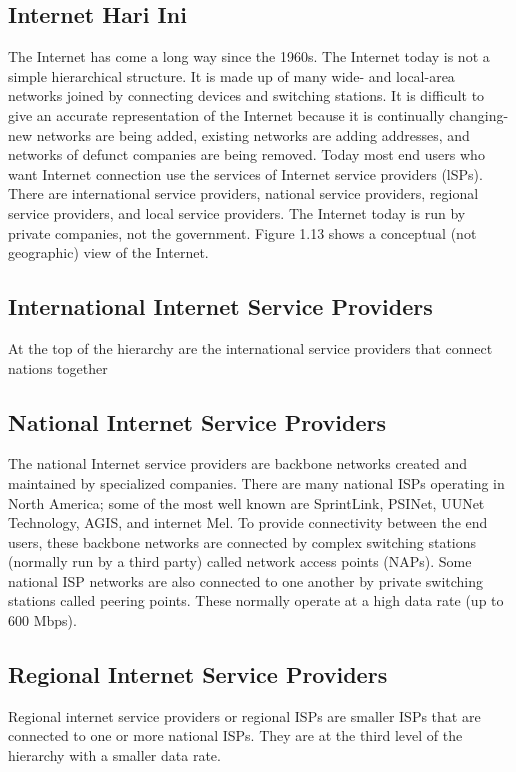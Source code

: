 \subsection{Internet Hari Ini}
The Internet has come a long way since the 1960s. The Internet today is not a simple hierarchical structure. It is made up of many wide- and local-area networks joined by connecting devices and switching stations. It is difficult to give an accurate representation of the Internet because it is continually changing-new networks are being added, existing networks are adding addresses, and networks of defunct companies are being removed. Today most end users who want Internet connection use the services of Internet service providers (lSPs). There are international service providers, national service providers, regional service providers, and local service providers. The Internet today is run by private companies, not the government. Figure 1.13 shows a conceptual (not geographic) view of the Internet.

\subsection*{International Internet Service Providers}
At the top of the hierarchy are the international service providers that connect nations together

\subsection*{National Internet Service Providers}
The national Internet service providers are backbone networks created and maintained by specialized companies. There are many national ISPs operating in North America; some of the most well known are SprintLink, PSINet, UUNet Technology, AGIS, and internet Mel. To provide connectivity between the end users, these backbone networks are connected by complex switching stations (normally run by a third party) called network access points (NAPs). Some national ISP networks are also connected to one another by private switching stations called peering points. These normally operate at a high data rate (up to 600 Mbps).

\subsection*{Regional Internet Service Providers}
Regional internet service providers or regional ISPs are smaller ISPs that are connected to one or more national ISPs. They are at the third level of the hierarchy with a smaller data rate.

